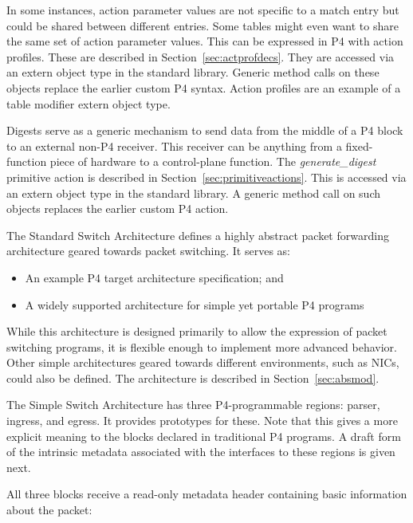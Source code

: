 \documentclass[12pt]{article}
\begin{document}
In some instances, action parameter values are not specific to a match entry but
could be shared between different entries. Some tables might even want to share
the same set of action parameter values. This can be expressed in P4 with
action profiles.  These are described in Section~\ref{sec:actprofdecs}.  They
are accessed via an extern object type in the standard library.
Generic method calls on these objects replace the earlier custom P4 syntax.
Action profiles are an example of a table modifier extern object type.


Digests serve as a generic mechanism to send data from the middle of a P4 block
to an external non-P4 receiver. This receiver can be anything from a
fixed-function piece of hardware to a control-plane function.  The
\textit{generate_digest} primitive action is described in
Section~\ref{sec:primitiveactions}.  This is accessed via an extern object
type in the standard library.  A generic method call on such objects replaces
the earlier custom P4 action.



The Standard Switch Architecture defines a highly abstract packet forwarding
architecture geared towards packet switching.  It serves as:
\begin{itemize}
\item
An example P4 target architecture specification; and
\item
A widely supported architecture for simple yet portable P4 programs
\end{itemize}
While this architecture is designed primarily to allow the expression of packet
switching programs, it is flexible enough to implement more advanced behavior.
Other simple architectures geared towards different environments, such as NICs,
could also be defined.  The architecture is described in
Section~\ref{sec:absmod}.


The Simple Switch Architecture has three P4-programmable regions: parser,
ingress, and egress.  It provides prototypes for these.  Note that this gives
a more explicit meaning to the blocks declared in traditional P4 programs.
A draft form of the intrinsic metadata associated with the interfaces
to these regions is given next.


All three blocks receive a read-only metadata header containing basic
information about the packet:
\end{document}
